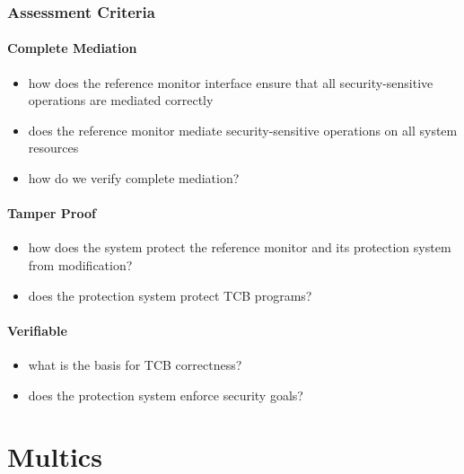 \documentclass[
  12pt]{findlay}
\providecommand{\tightlist}{%
  \setlength{\itemsep}{0pt}\setlength{\parskip}{0pt}}
\begin{document}
\hypertarget{assessment-criteria}{%
\subsubsection{Assessment Criteria}\label{assessment-criteria}}

\hypertarget{complete-mediation}{%
\paragraph{Complete Mediation}\label{complete-mediation}}

\begin{itemize}
\tightlist
\item
  how does the reference monitor interface ensure that all
  security-sensitive operations are mediated correctly
\item
  does the reference monitor mediate security-sensitive operations on
  all system resources
\item
  how do we verify complete mediation?
\end{itemize}

\hypertarget{tamper-proof}{%
\paragraph{Tamper Proof}\label{tamper-proof}}

\begin{itemize}
\tightlist
\item
  how does the system protect the reference monitor and its protection
  system from modification?
\item
  does the protection system protect TCB programs?
\end{itemize}

\hypertarget{verifiable}{%
\paragraph{Verifiable}\label{verifiable}}

\begin{itemize}
\tightlist
\item
  what is the basis for TCB correctness?
\item
  does the protection system enforce security goals?
\end{itemize}

\hypertarget{multics}{%
\section{Multics}\label{multics}}
\end{document}
